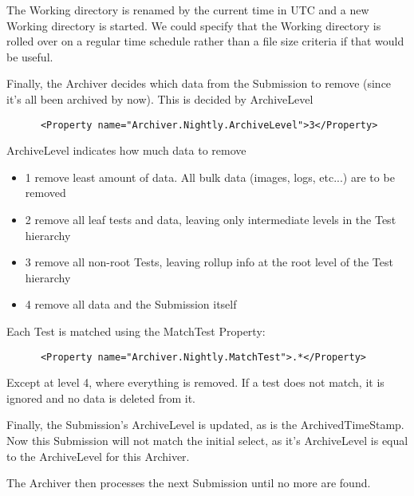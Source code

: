 \documentclass{InsightBook}
\begin{document}
The Working directory is renamed by the current time in UTC and a new Working directory is started.  We could specify that the Working directory is rolled over on a regular time schedule rather than a file size criteria if that would be useful.

Finally, the Archiver decides which data from the Submission to remove (since it's all been archived by now).  This is decided by ArchiveLevel
\begin{verbatim}
      <Property name="Archiver.Nightly.ArchiveLevel">3</Property>
\end{verbatim}

 ArchiveLevel indicates how much data to remove
\begin{itemize}
             \item 1 remove least amount of data.  All bulk data (images, logs, etc...) are to be removed
             \item 2 remove all leaf tests and data, leaving only intermediate levels in the Test hierarchy
             \item 3 remove all non-root Tests, leaving rollup info at the root level of the Test hierarchy
             \item 4 remove all data and the Submission itself
\end{itemize}

Each Test is matched using the MatchTest Property:
\begin{verbatim}
      <Property name="Archiver.Nightly.MatchTest">.*</Property>
\end{verbatim}

Except at level 4, where everything is removed.  If a test does not match, it is ignored and no data is deleted from it.

Finally, the Submission's ArchiveLevel is updated, as is the ArchivedTimeStamp.  Now this Submission will not match the initial select, as it's ArchiveLevel is equal to the ArchiveLevel for this Archiver.

The Archiver then processes the next Submission until no more are found.
\end{document}
